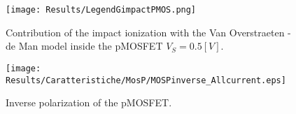\begin{figure}[!h]
\centering
{}
\hspace{0.06\textwidth}
\hspace{0.04\textwidth}
{\texttt{[image: Results/LegendGimpactPMOS.png]}}
\caption{Contribution of the impact ionization with the Van Overstraeten - de Man model inside the pMOSFET $V_S=0.5[V]$.}
\label{fig: II pMOS}
\end{figure}


\begin{figure}[!b]
\flushleft
\texttt{[image: Results/Caratteristiche/MosP/MOSPinverse\_Allcurrent.eps]}
\caption{Inverse polarization of the pMOSFET.}
\label{fig: tutte le correnti Pmos stress}
\end{figure}

